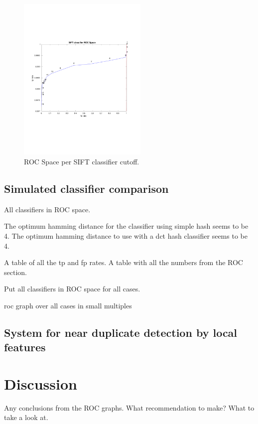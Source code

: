 \documentclass[english,12pt,a4paper,pdftex,elec,utf8]{aaltothesis}
\begin{document}
\begin{figure}[htb]
\begin{center}
\includegraphics[height=8cm]{figures/SIFTROCperCutoff}
\end{center}
\caption{ ROC Space per SIFT classifier cutoff. }
\label{figcutoffrocspace}
\end{figure}



\subsection{Simulated classifier comparison}
All classifiers in ROC space.

The optimum hamming distance for the classifier using simple hash seems to be 4.
The optimum hamming distance to use with a dct hash classifier seems to be 4.

A table of all the tp and fp rates.
A table with all the numbers from the ROC section.

Put all classifiers in ROC space for all cases.

roc graph over all cases in small multiples

\subsection{System for near duplicate detection by local features}


\clearpage

\section{Discussion}
Any conclusions from the ROC graphs. What recommendation to make? What to take a look at.
\end{document}
